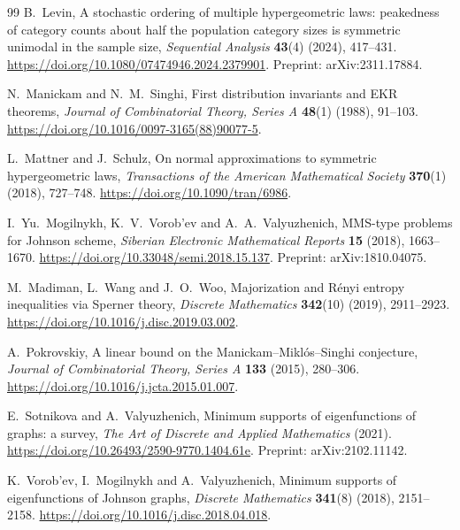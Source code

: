 \documentclass[11pt]{article}
\theoremstyle{remark}
\begin{document}
\begin{thebibliography}{99}
B.~Levin,
A stochastic ordering of multiple hypergeometric laws: peakedness of category
counts about half the population category sizes is symmetric unimodal in the
sample size,
\emph{Sequential Analysis} \textbf{43}(4) (2024), 417--431.
\url{https://doi.org/10.1080/07474946.2024.2379901}.
Preprint: arXiv:2311.17884.

N.~Manickam and N.~M.~Singhi,
First distribution invariants and EKR theorems,
\emph{Journal of Combinatorial Theory, Series A} \textbf{48}(1) (1988), 91--103.
\url{https://doi.org/10.1016/0097-3165(88)90077-5}.

L.~Mattner and J.~Schulz,
On normal approximations to symmetric hypergeometric laws,
\emph{Transactions of the American Mathematical Society} \textbf{370}(1) (2018), 727--748.
\url{https://doi.org/10.1090/tran/6986}.

I.~Yu.~Mogilnykh, K.~V.~Vorob'ev and A.~A.~Valyuzhenich,
MMS-type problems for Johnson scheme,
\emph{Siberian Electronic Mathematical Reports} \textbf{15} (2018), 1663--1670.
\url{https://doi.org/10.33048/semi.2018.15.137}.
Preprint: arXiv:1810.04075.

M.~Madiman, L.~Wang and J.~O.~Woo,
Majorization and R\'enyi entropy inequalities via Sperner theory,
\emph{Discrete Mathematics} \textbf{342}(10) (2019), 2911--2923.
\url{https://doi.org/10.1016/j.disc.2019.03.002}.

A.~Pokrovskiy,
A linear bound on the Manickam--Mikl\'os--Singhi conjecture,
\emph{Journal of Combinatorial Theory, Series A} \textbf{133} (2015), 280--306.
\url{https://doi.org/10.1016/j.jcta.2015.01.007}.

E.~Sotnikova and A.~Valyuzhenich,
Minimum supports of eigenfunctions of graphs: a survey,
\emph{The Art of Discrete and Applied Mathematics} (2021).
\url{https://doi.org/10.26493/2590-9770.1404.61e}.
Preprint: arXiv:2102.11142.

K.~Vorob'ev, I.~Mogilnykh and A.~Valyuzhenich,
Minimum supports of eigenfunctions of Johnson graphs,
\emph{Discrete Mathematics} \textbf{341}(8) (2018), 2151--2158.
\url{https://doi.org/10.1016/j.disc.2018.04.018}.
\end{thebibliography}
\end{document}
